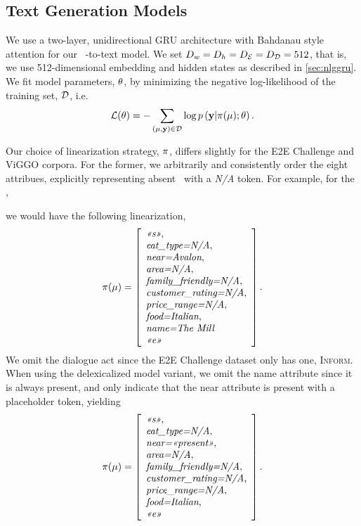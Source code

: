 \subsection{Text Generation Models}

We use a two-layer, unidirectional GRU architecture with Bahdanau style
attention for our 
 \sequencetosequence~\meaningrepresentation-to-text model. We set $D_{w} = D_{h} = {D_\mathcal{E}} = {D_\mathcal{D}} = 512$, that is, we use 512-dimensional embedding and hidden states as 
described in \autoref{sec:nlggru}.
We fit model parameters, $\theta$, by minimizing the negative log-likelihood
of the training set, $\mathcal{D}$, i.e. \[\mathcal{L}(\theta) = - \sum_{(\mu, \mathbf{y}) \in \mathcal{D}  }  \log p\left(\mathbf{y}|\pi(\mu);\theta\right).\]

Our choice of linearization strategy, $\pi$, differs slightly for the 
E2E Challenge and ViGGO corpora. For the former, we arbitrarily and 
consistently order the eight attribues, explicitly representing absent
\attributevalues~with a \textit{N/A} token. For example, for the \meaningrepresentation, 
\begin{singlespace}
    \centering
\end{singlespace}
\noindent we would have the following linearization,
\[ \pi(\mu) = \left[\begin{array}{l} \textit{<<s>>},\\ \textit{eat\_type=N/A},\\ \textit{near=Avalon},\\ \textit{area=N/A}, \\ \textit{family\_friendly=N/A},\\ \textit{customer\_rating=N/A}, \\\textit{price\_range=N/A},\\ \textit{food=Italian},\\ \textit{name=The Mill}\\ \textit{<<e>>} \end{array}\right].\] 
    We omit the dialogue act since the E2E Challenge dataset only has one, \textsc{Inform}. When
    using the delexicalized model variant, we omit the name attribute since
    it is always present, and only indicate that the near attribute is present
    with a placeholder
    token, yielding 
\[ \pi(\mu) = \left[\begin{array}{l} \textit{<<s>>},\\ \textit{eat\_type=N/A},\\ \textit{near=<<present>>},\\ \textit{area=N/A}, \\ \textit{family\_friendly=N/A},\\ \textit{customer\_rating=N/A}, \\\textit{price\_range=N/A},\\ \textit{food=Italian},\\ \textit{<<e>>} \end{array}\right].\] 

